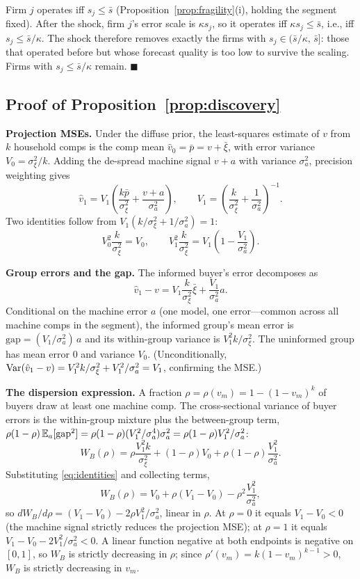 Firm $j$ operates iff $s_j \le \bar s$ (Proposition~\ref{prop:fragility}(i), holding the segment fixed). After the shock, firm $j$'s error scale is $\kappa s_j$, so it operates iff $\kappa s_j \le \bar s$, i.e., iff $s_j \le \bar s / \kappa$. The shock therefore removes exactly the firms with $s_j \in (\bar s/\kappa,\, \bar s]$: those that operated before but whose forecast quality is too low to survive the scaling. Firms with $s_j \le \bar s / \kappa$ remain. $\blacksquare$

\subsection{Proof of Proposition~\ref{prop:discovery}}

\textbf{Projection MSEs.} Under the diffuse prior, the least-squares estimate of $v$ from $k$ household comps is the comp mean $\hat v_0 = \bar p = v + \bar \xi$, with error variance $V_0 = \sigma_\xi^2 / k$. Adding the de-spread machine signal $v + a$ with variance $\sigma_a^2$, precision weighting gives
\[
\hat v_1 = V_1 \left( \frac{k \bar p}{\sigma_\xi^2} + \frac{v + a}{\sigma_a^2} \right),
\qquad
V_1 = \left( \frac{k}{\sigma_\xi^2} + \frac{1}{\sigma_a^2} \right)^{-1}.
\]
Two identities follow from $V_1 (k/\sigma_\xi^2 + 1/\sigma_a^2) = 1$:
\[
V_0^2 \frac{k}{\sigma_\xi^2} = V_0,
\qquad
V_1^2 \frac{k}{\sigma_\xi^2} = V_1 \left( 1 - \frac{V_1}{\sigma_a^2} \right).
\tag{A.1}\label{eq:identities}
\]

\textbf{Group errors and the gap.} The informed buyer's error decomposes as
\[
\hat v_1 - v = V_1 \frac{k}{\sigma_\xi^2} \bar \xi + \frac{V_1}{\sigma_a^2} a .
\]
Conditional on the machine error $a$ (one model, one error---common across all machine comps in the segment), the informed group's mean error is $\mathrm{gap} = (V_1/\sigma_a^2)\, a$ and its within-group variance is $V_1^2 k / \sigma_\xi^2$. The uninformed group has mean error $0$ and variance $V_0$. (Unconditionally, $\mathrm{Var}(\hat v_1 - v) = V_1^2 k/\sigma_\xi^2 + V_1^2/\sigma_a^2 = V_1$, confirming the MSE.)

\textbf{The dispersion expression.} A fraction $\rho = \rho(v_m) = 1 - (1 - v_m)^k$ of buyers draw at least one machine comp. The cross-sectional variance of buyer errors is the within-group mixture plus the between-group term, $\rho(1-\rho)\,\mathbb{E}_a[\mathrm{gap}^2] = \rho(1-\rho) (V_1^2/\sigma_a^4)\sigma_a^2 = \rho(1-\rho) V_1^2/\sigma_a^2$:
\[
W_B(\rho) = \rho \frac{V_1^2 k}{\sigma_\xi^2} + (1 - \rho) V_0 + \rho(1-\rho)\frac{V_1^2}{\sigma_a^2}.
\]
Substituting \eqref{eq:identities} and collecting terms,
\[
W_B(\rho) = V_0 + \rho (V_1 - V_0) - \rho^2 \frac{V_1^2}{\sigma_a^2},
\]
so $dW_B/d\rho = (V_1 - V_0) - 2\rho V_1^2/\sigma_a^2$, linear in $\rho$. At $\rho = 0$ it equals $V_1 - V_0 < 0$ (the machine signal strictly reduces the projection MSE); at $\rho = 1$ it equals $V_1 - V_0 - 2V_1^2/\sigma_a^2 < 0$. A linear function negative at both endpoints is negative on $[0,1]$, so $W_B$ is strictly decreasing in $\rho$; since $\rho'(v_m) = k(1 - v_m)^{k-1} > 0$, $W_B$ is strictly decreasing in $v_m$.


